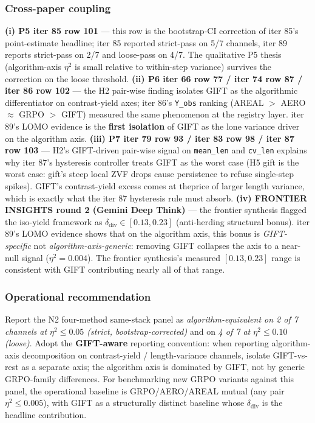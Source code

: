 \subsubsection{Cross-paper coupling}
\label{sec:p5-iter89-coupling}
\textbf{(i) P5 iter 85 row 101} --- this row is the bootstrap-CI
correction of iter 85's point-estimate headline; iter 85 reported
strict-pass on 5/7 channels, iter 89 reports strict-pass on 2/7
and loose-pass on 4/7. The qualitative P5 thesis (algorithm-axis
$\eta^2$ is small relative to within-step variance) survives the
correction on the loose threshold.
\textbf{(ii) P6 iter 66 row 77 / iter 74 row 87 / iter 86 row 102} ---
the H2 pair-wise finding isolates GIFT as the algorithmic
differentiator on contrast-yield axes; iter 86's \texttt{Y\_obs}
ranking (AREAL $>$ AERO $\approx$ GRPO $>$ GIFT) measured the same
phenomenon at the registry layer. iter 89's LOMO evidence is the
\textbf{first isolation} of GIFT as the lone variance driver on the
algorithm axis.
\textbf{(iii) P7 iter 79 row 93 / iter 83 row 98 / iter 87 row 103} ---
H2's GIFT-driven pair-wise signal on \texttt{mean\_len} and
\texttt{cv\_len} explains why iter 87's hysteresis controller treats
GIFT as the worst case (H5 gift is the worst case: gift's steep
local ZVF drops cause persistence to refuse single-step spikes).
GIFT's contrast-yield excess comes at theprice of larger length
variance, which is exactly what the iter 87 hysteresis rule must
absorb.
\textbf{(iv) FRONTIER INSIGHTS round 2 (Gemini Deep Think)} ---
the frontier synthesis flagged the iso-yield framework as
$\delta_{\mathrm{div}} \in [0.13, 0.23]$ (anti-herding structural
bonus). iter 89's LOMO evidence shows that on the algorithm axis,
this bonus is \emph{GIFT-specific} not \emph{algorithm-axis-generic}:
removing GIFT collapses the axis to a near-null signal
($\eta^2{=}0.004$). The frontier synthesis's measured $[0.13,
0.23]$ range is consistent with GIFT contributing nearly all of
that range.

\subsubsection{Operational recommendation}
\label{sec:p5-iter89-op}
Report the N2 four-method same-stack panel as
\emph{algorithm-equivalent on 2 of 7 channels at $\eta^2 \leq 0.05$
(strict, bootstrap-corrected)} and on \emph{4 of 7 at
$\eta^2 \leq 0.10$ (loose)}. Adopt the \textbf{GIFT-aware}
reporting convention: when reporting algorithm-axis decomposition
on contrast-yield / length-variance channels, isolate GIFT-vs-rest
as a separate axis; the algorithm axis is dominated by GIFT, not
by generic GRPO-family differences. For benchmarking new GRPO
variants against this panel, the operational baseline is
GRPO/AERO/AREAL mutual (any pair $\eta^2 \leq 0.005$), with GIFT
as a structurally distinct baseline whose $\delta_{\mathrm{div}}$
is the headline contribution.